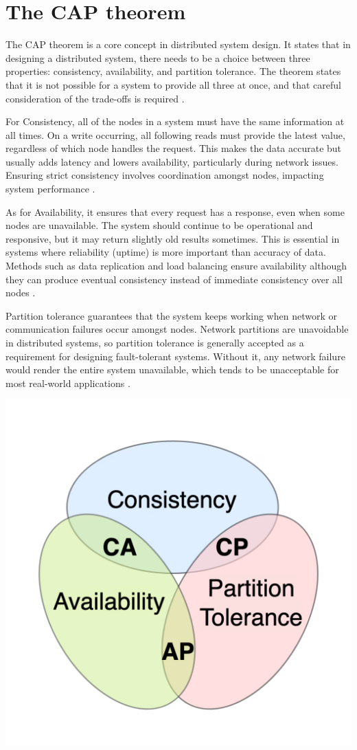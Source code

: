 \documentclass[]{final}
\begin{document}
\section{The CAP theorem}

The CAP theorem is a core concept in distributed system design. It states that
in designing a distributed system, there needs to be a choice between three
properties: consistency, availability, and partition tolerance. The theorem
states that it is not possible for a system to provide all three at once,
and that careful consideration of the trade-offs is required \cite{noauthor_cap_nodate}.

For Consistency, all of the nodes in a system must have the same information
at all times. On a write occurring, all following reads must provide the latest
value, regardless of which node handles the request. This makes the data
accurate but usually adds latency and lowers availability, particularly
during network issues. Ensuring strict consistency involves coordination
amongst nodes, impacting system performance \cite{noauthor_cap_nodate}.

As for Availability, it ensures that every request has a response, even when
some nodes are unavailable. The system should continue to be operational and
responsive, but it may return slightly old results sometimes. This is
essential in systems where reliability (uptime) is more important than
accuracy of data. Methods such as data replication and load balancing
ensure availability although they can produce eventual consistency instead
of immediate consistency over all nodes \cite{noauthor_cap_nodate}.

Partition tolerance guarantees that the system keeps working when network or
communication failures occur amongst nodes. Network partitions are unavoidable
in distributed systems, so partition tolerance is generally accepted as a
requirement for designing fault-tolerant systems. Without it, any network
failure would render the entire system unavailable, which tends to be
unacceptable for most real-world applications \cite{noauthor_cap_nodate}.

\includegraphics[width=.3\linewidth]{CAPtheorem.png}
\end{document}
